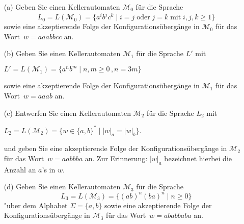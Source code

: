 

\begin{exercise}

\vspace*{0.3cm}
\begin{enumerate}
\item[(a)] Geben Sie einen Kellerautomaten $\mathcal{M}_0$ für die Sprache
  $$L_0 = L(\mathcal{M}_0) = \{a^ib^jc^k \mid i=j \;\text{oder}\; j=k\;\text{mit}\;i,j,k\ge 1\}$$
  sowie eine akzeptierende Folge der Konfigurations\"uberg\"ange in $\mathcal{M}_0$ 
f\"ur das Wort~$w=aaabbcc$ an. 
\item[(b)] Geben Sie einen Kellerautomaten ${\mathcal M_1}$ f\"ur die Sprache $L'$ mit
\begin{center}
$L'=L(\mathcal M_1)=\{a^{n}b^m\mid  n,m\ge 0\,, n=3m\}$
\end{center}
sowie eine akzeptierende Folge der Konfigurations\"uberg\"ange in $\mathcal{M}_1$ 
f\"ur das Wort~$w=aaab$ an.
\item[(c)] Entwerfen Sie einen Kellerautomaten ${\mathcal M_2}$ f\"ur die Sprache $L_2$ mit
\begin{center}
$L_2=L(\mathcal M_2) = \{w\in\{a,b\}^*\mid |w|_a = |w|_b\}$\;.
\end{center}
und geben Sie eine akzeptierende Folge der
Konfigurations\"uberg\"ange in $\mathcal{M}_2$ 
f\"ur das Wort~$w=aabbba$ an. Zur Erinnerung:
$|w|_a$ bezeichnet hierbei die Anzahl an $a$'s 
in $w$.
\item[(d)] Geben Sie einen Kellerautomaten $\mathcal{M}_3$ für die Sprache 
   $$L_3 = L(\mathcal{M}_3) = \{ (ab)^{n}  (ba)^{n} \mid n \geq 0 \}$$
  "uber dem Alphabet $ \Sigma = \{ a, b \} $ 
  sowie eine akzeptierende Folge der Konfigurations\"uberg\"ange in $\mathcal{M}_3$
  für das Wort~$w=ababbaba$ an. 
\end{enumerate}

\end{exercise}

